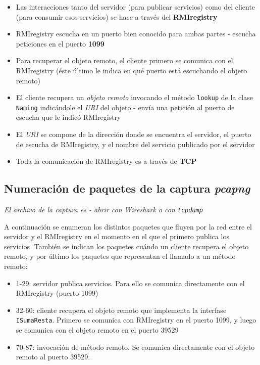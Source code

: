 \begin{itemize}
    \item Las interacciones tanto del servidor (para publicar servicios) como del cliente (para consumir esos servicios) se hace a través del \textbf{RMIregistry} 
    \item RMIregistry escucha en un puerto bien conocido para ambas partes - escucha peticiones en el puerto \textbf{1099}
    \item Para recuperar el objeto remoto, el cliente primero se comunica con el RMIregistry (éste último le indica en qué puerto está escuchando el objeto remoto)
    \item El cliente recupera un \emph{objeto remoto} invocando el método \texttt{lookup} de la clase \texttt{Naming} indicándole el \emph{URI} del objeto - envía una petición al puerto de escucha que le indicó RMIregistry
    \item El \emph{URI} se compone de la dirección donde se encuentra el servidor, el puerto de escucha de RMIregistry, y el nombre del servicio publicado por el servidor
    \item Toda la comunicación de RMIregistry es a través de \textbf{TCP} 
\end{itemize}

\subsection{Numeración de paquetes de la captura \emph{pcapng}}

\emph{El archivo de la captura es  - abrir con Wireshark o con \texttt{tcpdump}} 

A continuación se enumeran los distintos paquetes que fluyen por la red entre el servidor y el RMIregistry en el momento en el que el primero publica los servicios. También se indican los paquetes cuándo un cliente recupera el objeto remoto, y por último los paquetes que representan el llamado a un método remoto: 

\begin{itemize}
    \item 1-29: servidor publica servicios. Para ello se comunica directamente con el RMIregistry (puerto 1099)
    \item 32-60: cliente recupera el objeto remoto que implementa la interfase \texttt{ISumaResta}. Primero se comunica con RMIregistry en el puerto 1099, y luego se comunica con el objeto remoto en el puerto 39529 
    \item 70-87: invocación de método remoto. Se comunica directamente con el objeto remoto al puerto 39529.
\end{itemize}

